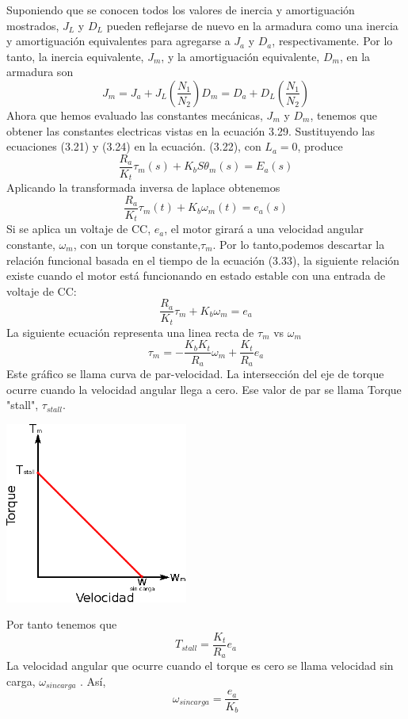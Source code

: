 Suponiendo que se conocen todos los valores de inercia y amortiguación mostrados, $J_L$ y $D_L$ pueden reflejarse de nuevo en la
armadura como una inercia y amortiguación equivalentes para agregarse a $J_a$ y $D_a$, respectivamente. Por lo tanto, la inercia
equivalente, $J_m$, y la amortiguación equivalente, $D_m$, en la armadura son
\begin{subequations}
	\begin{equation}
		J_m = J_a + J_L \left( \frac{N_1}{N_2} \right)
	\end{equation}
	\begin{equation}
		D_m = D_a + D_L\left( \frac{N_1}{N_2} \right)
	\end{equation}
\end{subequations}
Ahora que hemos evaluado las constantes mecánicas, $J_m$ y $D_m$, tenemos que obtener las constantes electricas vistas en la
ecuación 3.29. Sustituyendo las ecuaciones (3.21) y (3.24) en la ecuación. (3.22), con $L_a = 0$, produce
\begin{equation}
	\frac{R_a}{K_t} \tau_m (s) + K_bS\theta_m(s) = E_a(s)
\end{equation}
Aplicando la transformada inversa de laplace obtenemos
\begin{equation}
	\frac{R_a}{K_t} \tau_m (t) + K_b\omega_m(t) = e_a(s)
\end{equation}
Si se aplica un voltaje de CC, $e_a$, el motor girará a una velocidad angular constante, $\omega_m$, con un torque constante,$\tau_m$.
Por lo tanto,podemos descartar la relación funcional basada en el tiempo de la ecuación (3.33), la siguiente relación existe
cuando el motor está funcionando en estado estable con una entrada de voltaje de CC:
\begin{equation}
	\frac{R_a}{K_t} \tau_m + K_b\omega_m = e_a
\end{equation}
La siguiente ecuación representa una linea recta de $\tau_m$ vs $\omega_m$
\begin{equation}
	\tau_m = -\frac{K_bK_t}{R_a} \omega_m + \frac{K_t}{R_a}e_a
\end{equation}
Este gráfico se llama curva de par-velocidad. La intersección del eje de torque ocurre cuando la velocidad angular llega a cero.
Ese valor de par se llama Torque "stall", $\tau_{stall}$.
\begin{center}
	\includegraphics[width=0.45\textwidth]{Contenido/Cuerpo/Capitulo3/Fig19.eps}
	\label{fig:ModeloMat:Fig1}
\end{center}
Por tanto tenemos que
\begin{equation}
	T_{stall} = \frac{K_t}{R_a}e_a
\end{equation}
La velocidad angular que ocurre cuando el torque es cero se llama velocidad sin carga, $\omega_{sin carga}$ . Así,
\begin{equation}
	\omega_{sin carga} = \frac{e_a}{K_b}
\end{equation}